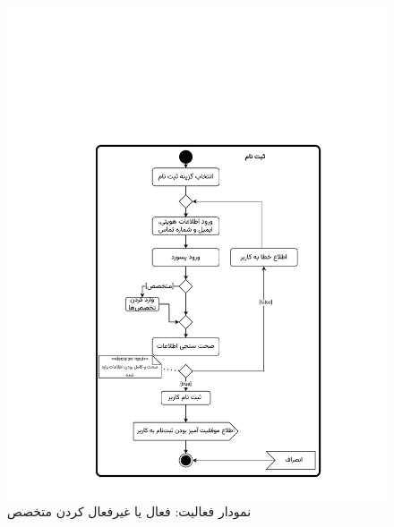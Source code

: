 \begin{figure}
	\centering
	\includegraphics[scale=0.8, page=8]{figs/OOD-activity1-10.pdf}
	\caption{نمودار فعالیت: فعال یا غیرفعال کردن متخصص}
\end{figure}
\FloatBarrier
\newpage

